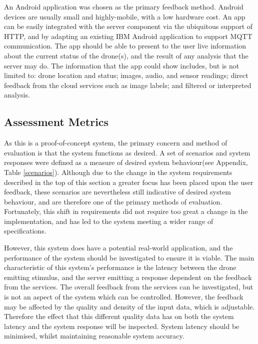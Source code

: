 \documentclass{article}
\begin{document}
An Android application was chosen as the primary feedback method. Android devices are usually small and highly-mobile, with a low hardware cost. An app can be easily integrated with the server component via the ubiquitous support of HTTP, and by adapting an existing IBM Android application to support MQTT communication\cite{iotStarterAndroid}. The app should be able to present to the user live information about the current status of the drone(s), and the result of any analysis that the server may do. The information that the app could show includes, but is not limited to: drone location and status; images, audio, and sensor readings; direct feedback from the cloud services such as image labels; and filtered or interpreted analysis.

\subsection{Assessment Metrics}
As this is a proof-of-concept system, the primary concern and method of evaluation is that the system functions as desired. A set of scenarios and system responses were defined as a measure of desired system behaviour(see Appendix, Table \ref{scenarios}). Although due to the change in the system requirements described in the top of this section a greater focus has been placed upon the user feedback, these scenarios are nevertheless still indicative of desired system behaviour, and are therefore one of the primary methods of evaluation. Fortunately, this shift in requirements did not require too great a change in the implementation, and has led to the system meeting a wider range of specifications.

However, this system does have a potential real-world application, and the performance of the system should be investigated to ensure it is viable. The main characteristic of this system's performance is the latency between the drone emitting stimulus, and the server emitting a response dependent on the feedback from the services. The overall feedback from the services can be investigated, but is not an aspect of the system which can be controlled. However, the feedback may be affected by the quality and density of the input data, which is adjustable. Therefore the effect that this different quality data has on both the system latency and the system response will be inspected. System latency should be minimised, whilst maintaining reasonable system accuracy.
\end{document}
